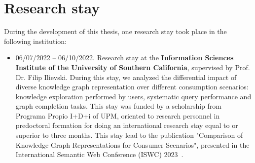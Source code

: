 \section{Research stay}

During the development of this thesis, one research stay took place in the following institution:

\begin{itemize}
    \item 06/07/2022 -- 06/10/2022. Research stay at the \textbf{Information Sciences Institute of the University of Southern California}, supervised by Prof. Dr. Filip Ilievski. During this stay, we analyzed the differential impact of diverse knowledge graph representation over different consumption scenarios: knowledge exploration performed by users, systematic query performance and graph completion tasks. This stay was funded by a scholarship from Programa Propio I+D+i of UPM, oriented to research personnel in predoctoral formation for doing an international research stay equal to or superior to three months. This stay lead to the publication "Comparison of Knowledge Graph Representations for Consumer Scenarios", presented in the International Semantic Web Conference (ISWC) 2023~\parencite{iglesias2023kgconsumption}.
\end{itemize}

